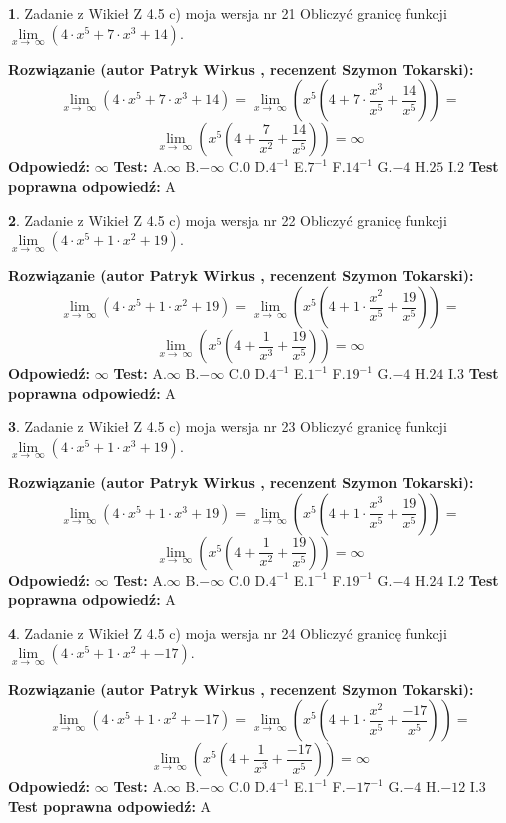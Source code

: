 \documentclass[12pt, a4paper]{article}
\theoremstyle{definition} %
\newtheorem{zad}{}
\newcommand{\zadStart}[1]{\begin{zad}#1\newline}
\newcommand{\zadStop}{\end{zad}}
\newcommand{\rozwStart}[2]{\noindent \textbf{Rozwiązanie (autor #1 , recenzent #2): }\newline}
\newcommand{\rozwStop}{\newline}
\newcommand{\odpStart}{\noindent \textbf{Odpowiedź:}\newline}
\newcommand{\odpStop}{\newline}
\newcommand{\testStart}{\noindent \textbf{Test:}\newline}
\newcommand{\testStop}{\newline}
\newcommand{\kluczStart}{\noindent \textbf{Test poprawna odpowiedź:}\newline}
\newcommand{\kluczStop}{\newline}
\begin{document}
\zadStart{Zadanie z Wikieł Z 4.5 c) moja wersja nr 21}
Obliczyć granicę funkcji  $\lim\limits_{x\to\ \infty}(4 \cdot x^{5}+7 \cdot x^{3}+14)$.
\zadStop
\rozwStart{Patryk Wirkus}{Szymon Tokarski}
$$\lim\limits_{x\to\ \infty}(4 \cdot x^{5}+7 \cdot x^{3}+14) = \lim\limits_{x\to\ \infty}(x^{5}(4 +7 \cdot \frac{x^{3}}{x^{5}}+\frac{14}{x^{5}})) =$$ $$\lim\limits_{x\to\ \infty}(x^{5}(4 +\frac{7}{x^{2}}+\frac{14}{x^{5}})) =\infty$$
\rozwStop
\odpStart
$\infty$
\odpStop
\testStart
A.$\infty$ B.$-\infty$ C.$0$ D.$4^{-1}$ E.$7^{-1}$
F.$14^{-1}$ G.$-4$
H.$25$
I.$2$
\testStop
\kluczStart
A
\kluczStop



\zadStart{Zadanie z Wikieł Z 4.5 c) moja wersja nr 22}
Obliczyć granicę funkcji  $\lim\limits_{x\to\ \infty}(4 \cdot x^{5}+1 \cdot x^{2}+19)$.
\zadStop
\rozwStart{Patryk Wirkus}{Szymon Tokarski}
$$\lim\limits_{x\to\ \infty}(4 \cdot x^{5}+1 \cdot x^{2}+19) = \lim\limits_{x\to\ \infty}(x^{5}(4 +1 \cdot \frac{x^{2}}{x^{5}}+\frac{19}{x^{5}})) =$$ $$\lim\limits_{x\to\ \infty}(x^{5}(4 +\frac{1}{x^{3}}+\frac{19}{x^{5}})) =\infty$$
\rozwStop
\odpStart
$\infty$
\odpStop
\testStart
A.$\infty$ B.$-\infty$ C.$0$ D.$4^{-1}$ E.$1^{-1}$
F.$19^{-1}$ G.$-4$
H.$24$
I.$3$
\testStop
\kluczStart
A
\kluczStop



\zadStart{Zadanie z Wikieł Z 4.5 c) moja wersja nr 23}
Obliczyć granicę funkcji  $\lim\limits_{x\to\ \infty}(4 \cdot x^{5}+1 \cdot x^{3}+19)$.
\zadStop
\rozwStart{Patryk Wirkus}{Szymon Tokarski}
$$\lim\limits_{x\to\ \infty}(4 \cdot x^{5}+1 \cdot x^{3}+19) = \lim\limits_{x\to\ \infty}(x^{5}(4 +1 \cdot \frac{x^{3}}{x^{5}}+\frac{19}{x^{5}})) =$$ $$\lim\limits_{x\to\ \infty}(x^{5}(4 +\frac{1}{x^{2}}+\frac{19}{x^{5}})) =\infty$$
\rozwStop
\odpStart
$\infty$
\odpStop
\testStart
A.$\infty$ B.$-\infty$ C.$0$ D.$4^{-1}$ E.$1^{-1}$
F.$19^{-1}$ G.$-4$
H.$24$
I.$2$
\testStop
\kluczStart
A
\kluczStop



\zadStart{Zadanie z Wikieł Z 4.5 c) moja wersja nr 24}
Obliczyć granicę funkcji  $\lim\limits_{x\to\ \infty}(4 \cdot x^{5}+1 \cdot x^{2}+-17)$.
\zadStop
\rozwStart{Patryk Wirkus}{Szymon Tokarski}
$$\lim\limits_{x\to\ \infty}(4 \cdot x^{5}+1 \cdot x^{2}+-17) = \lim\limits_{x\to\ \infty}(x^{5}(4 +1 \cdot \frac{x^{2}}{x^{5}}+\frac{-17}{x^{5}})) =$$ $$\lim\limits_{x\to\ \infty}(x^{5}(4 +\frac{1}{x^{3}}+\frac{-17}{x^{5}})) =\infty$$
\rozwStop
\odpStart
$\infty$
\odpStop
\testStart
A.$\infty$ B.$-\infty$ C.$0$ D.$4^{-1}$ E.$1^{-1}$
F.$-17^{-1}$ G.$-4$
H.$-12$
I.$3$
\testStop
\kluczStart
A
\kluczStop
\end{document}
